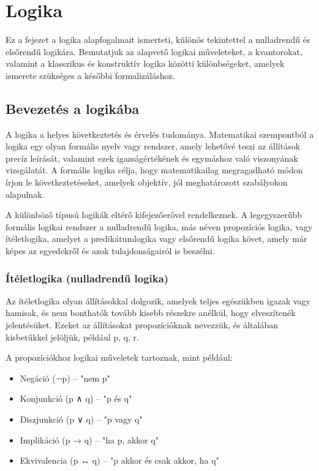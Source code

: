 \chapter{Logika}
\label{ch:logic}

Ez a fejezet a logika alapfogalmait ismerteti, különös tekintettel a nulladrendű és elsőrendű logikára. Bemutatjuk az alapvető logikai műveleteket, a kvantorokat, valamint a klasszikus és konstruktív logika közötti különbségeket, amelyek ismerete szükséges a későbbi formalizáláshoz.

\section{Bevezetés a logikába}

A logika a helyes következtetés és érvelés tudománya. Matematikai szempontból a logika egy olyan formális nyelv vagy rendszer, amely lehetővé teszi az állítások precíz leírását, valamint ezek igazságértékének és egymáshoz való viszonyának vizsgálatát. A formális logika célja, hogy matematikailag megragadható módon írjon le következtetéseket, amelyek objektív, jól meghatározott szabályokon alapulnak.

A különböző típusú logikák eltérő kifejezőerővel rendelkeznek. A legegyszerűbb formális logikai rendszer a nulladrendű logika, más néven propozíciós logika, vagy ítéletlogika, amelyet a predikátumlogika vagy elsőrendű logika követ, amely már képes az egyedekről és azok tulajdonságairól is beszélni.

\subsection{Ítéletlogika (nulladrendű logika)}

Az ítéletlogika olyan állításokkal dolgozik, amelyek teljes egészükben igazak vagy hamisak, és nem bonthatók tovább kisebb részekre anélkül, hogy elveszítenék jelentésüket. Ezeket az állításokat propozícióknak nevezzük, és általában kisbetűkkel jelöljük, például p, q, r.

A propozíciókhoz logikai műveletek tartoznak, mint például:

\begin{itemize}
\item Negáció (¬p) – "nem p"
\item Konjunkció (p ∧ q) – "p és q"
\item Diszjunkció (p ∨ q) – "p vagy q"
\item Implikáció (p → q) – "ha p, akkor q"
\item Ekvivalencia (p ↔ q) – "p akkor és csak akkor, ha q"
\end{itemize}

